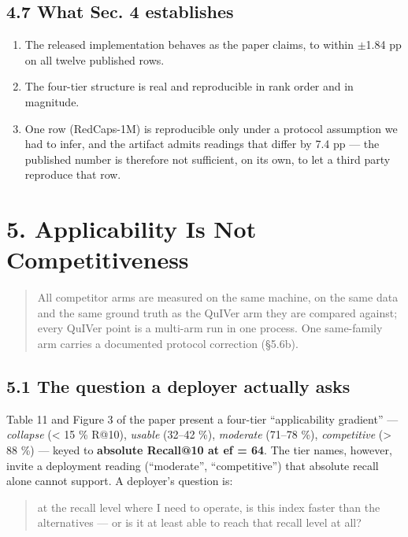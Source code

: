 \documentclass[
  10pt,
]{article}
\providecommand{\tightlist}{%
  \setlength{\itemsep}{0pt}\setlength{\parskip}{0pt}}
\begin{document}
\subsection{4.7 What Sec. 4 establishes}\label{what-sec.-4-establishes}

\begin{enumerate}
\def\labelenumi{\arabic{enumi}.}
\tightlist
\item
  The released implementation behaves as the paper claims, to within
  $\pm$1.84 pp on all twelve published rows.
\item
  The four-tier structure is real and reproducible in rank order and in
  magnitude.
\item
  One row (RedCaps-1M) is reproducible only under a protocol assumption
  we had to infer, and the artifact admits readings that differ by 7.4
  pp --- the published number is therefore not sufficient, on its own,
  to let a third party reproduce that row.
\end{enumerate}

\section{5. Applicability Is Not
Competitiveness}\label{applicability-is-not-competitiveness}

\begin{quote}
All competitor arms are measured on the same machine, on the same data
and the same ground truth as the QuIVer arm they are compared against;
every QuIVer point is a multi-arm run in one process. One same-family
arm carries a documented protocol correction (§5.6b).
\end{quote}

\subsection{5.1 The question a deployer actually
asks}\label{the-question-a-deployer-actually-asks}

Table 11 and Figure 3 of the paper present a four-tier ``applicability
gradient'' --- \emph{collapse} (\textless{} 15 \% R@10), \emph{usable}
(32--42 \%), \emph{moderate} (71--78 \%), \emph{competitive}
(\textgreater{} 88 \%) --- keyed to \textbf{absolute Recall@10 at ef =
64}. The tier names, however, invite a deployment reading (``moderate'',
``competitive'') that absolute recall alone cannot support. A deployer's
question is:

\begin{quote}
at the recall level where I need to operate, is this index faster than
the alternatives --- or is it at least able to reach that recall level
at all?
\end{quote}
\end{document}
